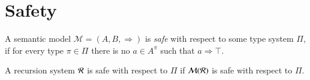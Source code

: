 \documentclass[a4paper,final,preprint,sort&compress]{elsarticle}
\newtheorem{lemma}[definition]{Lemma}
\newcommand{\Rules}{\ensuremath{\mathit{Rules}}}
\newcommand{\States}{\ensuremath{\mathit{States}}}
\DeclareMathOperator{\dom}{dom}
\DeclareMathOperator{\pto}{\hookrightarrow}
\begin{document}


\section{Safety}
\label{sec:Safety}


\begin{definition} \label{def:Safety}
  A semantic model $\mathcal{M} = (A,B,\Rightarrow)$ is \emph{safe} with respect to
  some type system $\Pi$, if for every type $\pi \in \Pi$ there is no $a \in A^\pi$ such that
  $a \Rightarrow \top$.
\end{definition}

A recursion system $\mathcal{R}$ is safe with respect to $\Pi$ if $\mathcal{M}(\mathcal{R})$ is safe with
respect to $\Pi$.

\end{document}
